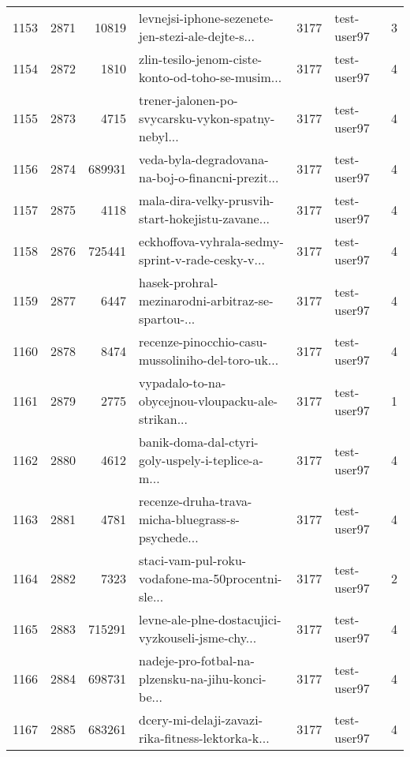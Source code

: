 \begin{tabular}{lrrlrlr}
1153 &       2871 &    10819 &  levnejsi-iphone-sezenete-jen-stezi-ale-dejte-s... &     3177 &                  test-user97 &               3 \\
1154 &       2872 &     1810 &  zlin-tesilo-jenom-ciste-konto-od-toho-se-musim... &     3177 &                  test-user97 &               4 \\
1155 &       2873 &     4715 &  trener-jalonen-po-svycarsku-vykon-spatny-nebyl... &     3177 &                  test-user97 &               4 \\
1156 &       2874 &   689931 &  veda-byla-degradovana-na-boj-o-financni-prezit... &     3177 &                  test-user97 &               4 \\
1157 &       2875 &     4118 &  mala-dira-velky-prusvih-start-hokejistu-zavane... &     3177 &                  test-user97 &               4 \\
1158 &       2876 &   725441 &  eckhoffova-vyhrala-sedmy-sprint-v-rade-cesky-v... &     3177 &                  test-user97 &               4 \\
1159 &       2877 &     6447 &  hasek-prohral-mezinarodni-arbitraz-se-spartou-... &     3177 &                  test-user97 &               4 \\
1160 &       2878 &     8474 &  recenze-pinocchio-casu-mussoliniho-del-toro-uk... &     3177 &                  test-user97 &               4 \\
1161 &       2879 &     2775 &  vypadalo-to-na-obycejnou-vloupacku-ale-strikan... &     3177 &                  test-user97 &               1 \\
1162 &       2880 &     4612 &  banik-doma-dal-ctyri-goly-uspely-i-teplice-a-m... &     3177 &                  test-user97 &               4 \\
1163 &       2881 &     4781 &  recenze-druha-trava-micha-bluegrass-s-psychede... &     3177 &                  test-user97 &               4 \\
1164 &       2882 &     7323 &  staci-vam-pul-roku-vodafone-ma-50procentni-sle... &     3177 &                  test-user97 &               2 \\
1165 &       2883 &   715291 &  levne-ale-plne-dostacujici-vyzkouseli-jsme-chy... &     3177 &                  test-user97 &               4 \\
1166 &       2884 &   698731 &  nadeje-pro-fotbal-na-plzensku-na-jihu-konci-be... &     3177 &                  test-user97 &               4 \\
1167 &       2885 &   683261 &  dcery-mi-delaji-zavazi-rika-fitness-lektorka-k... &     3177 &                  test-user97 &               4 \\

\end{tabular}
